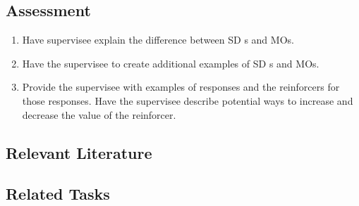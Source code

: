 \subsection{Assessment}
\begin{enumerate}
\item Have supervisee explain the difference between SD s and MOs.
\item Have the supervisee to create additional examples of SD s and MOs.
\item Provide the supervisee with examples of responses and the reinforcers for those responses. Have the supervisee describe potential ways to increase and decrease the value of the reinforcer.
%
\end{enumerate}
%
\subsection{Relevant Literature}
\begin{refsection}
\nocite{cooper2007applied,
        michael1982distinguishing}
\printbibliography[heading=none]
\end{refsection}
%
\subsection{Related Tasks}
\foureOne{}\\
\fourgEight{}\\
\fouriTwo{}\\
\fourjFour{}\\
\fourjSix{}\\
\fourjSeven{}\\
\fourkNine{}\\
\fourFKSeven{}\\
\fourFKTwentyFour{}\\
\fourFKTwentySix{}\\
\fourFKThirtyOne{}\\
\fourFKThirtyThree{}\\
